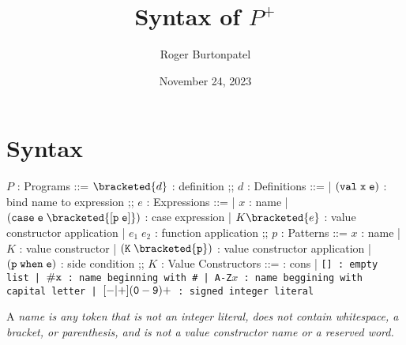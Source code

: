 \documentclass[]{article}
\title{Syntax of $P^{+}$}
\author{Roger Burtonpatel}
\date{November 24, 2023}
\begin{document}
\maketitle

\newcommand\la{\langle}
\newcommand\ra{\rangle}
\def\<#1>{\synt{#1}}

\newcommand\B[1]{\synt{#1}}

\section{Syntax}

\bigskip 
\begin{center}
    \begin{bnf}

    $P$ : \textsf{Programs} ::=
    $\bracketed{d}$ : definition
    ;;
    $d$ : \textsf{Definitions} ::=
    | $\tt{(val} \; x \; e\tt{)}$ : bind name to expression
    ;;
    $e$ : \textsf{Expressions} ::=
    | $x$ : name
    | $\tt{(case} \; e \; \bracketed{\tt{[} p \; e \tt{]}} \tt{)}$ : case expression 
    | $K \bracketed{e}$ : value constructor application 
    | $e_1 \; e_2$ : function application 
    ;;
    $p$ : \textsf{Patterns} ::= $x$ : name 
    | $K$ : value constructor 
    | $\tt{(}K \; \bracketed{p}\tt{)}$ : value constructor application 
    | $\tt{(}p \; \tt{when} \; e \tt{)}$ : side condition
    ;;
    $K$ : \textsf{Value Constructors} ::=
    \cons : cons 
    | \tt{[]} : empty list 
    | $\tt{\#}x$ : name beginning with \tt{\#}
    | \tt{A-Z}$x$ : name beggining with capital letter
    | $[\tt{-}\vert\tt{+}](\tt{0}-\tt{9})+$ : signed integer literal 

    \end{bnf}
\end{center}
\bigskip 

A \it{name} is any token that is not an integer literal, 
does not contain whitespace, a bracket, or parenthesis, 
and is not a value constructor name or a reserved word.

\bigskip



    
    
\end{document}
